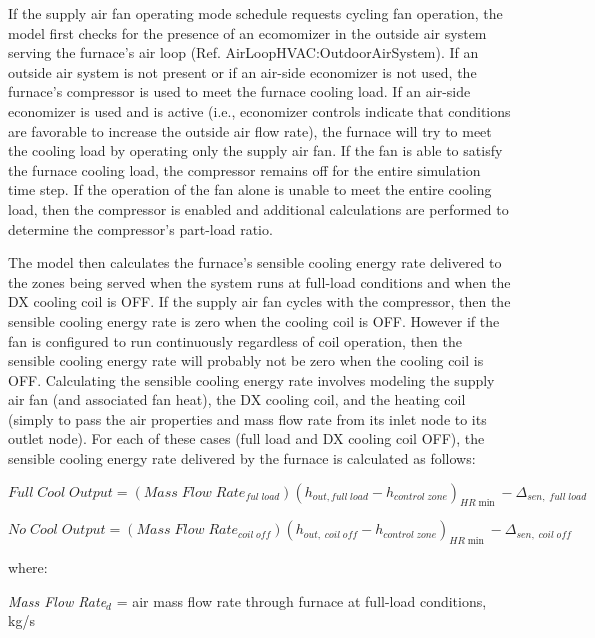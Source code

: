If the supply air fan operating mode schedule requests cycling fan operation, the model first checks for the presence of an ecomomizer in the outside air system serving the furnace's air loop (Ref. AirLoopHVAC:OutdoorAirSystem). If an outside air system is not present or if an air-side economizer is not used, the furnace's compressor is used to meet the furnace cooling load. If an air-side economizer is used and is active (i.e., economizer controls indicate that conditions are favorable to increase the outside air flow rate), the furnace will try to meet the cooling load by operating only the supply air fan. If the fan is able to satisfy the furnace cooling load, the compressor remains off for the entire simulation time step. If the operation of the fan alone is unable to meet the entire cooling load, then the compressor is enabled and additional calculations are performed to determine the compressor's part-load ratio.

The model then calculates the furnace's sensible cooling energy rate delivered to the zones being served when the system runs at full-load conditions and when the DX cooling coil is OFF. If the supply air fan cycles with the compressor, then the sensible cooling energy rate is zero when the cooling coil is OFF. However if the fan is configured to run continuously regardless of coil operation, then the sensible cooling energy rate will probably not be zero when the cooling coil is OFF. Calculating the sensible cooling energy rate involves modeling the supply air fan (and associated fan heat), the DX cooling coil, and the heating coil (simply to pass the air properties and mass flow rate from its inlet node to its outlet node). For each of these cases (full load and DX cooling coil OFF), the sensible cooling energy rate delivered by the furnace is calculated as follows:

\begin{equation}
Full\;Cool\;Output = (Mass\;Flow\;Rat{e_{ful\;load}}){({h_{out,full\;load}} - {h_{control\;zone}})_{HR\min }} - {\Delta_{sen,\;full\;load}}
\end{equation}

\begin{equation}
No\;Cool\;Output = (Mass\;Flow\;Rat{e_{coil\;off}}){({h_{out,\;coil\;off}} - {h_{control\;zone}})_{HR\min }} - {\Delta_{sen,\;coil\;off}}
\end{equation}

where:

\emph{Mass Flow Rate\(_{d}\)} = air mass flow rate through furnace at full-load conditions, kg/s

